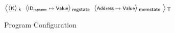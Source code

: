 \begin{figure}[ht]
  \centering
  \renewcommand{\dotCt}[1]{\scriptstyle\s{#1}}
  \newcommand{\regstate}{\scriptstyle\s{ID}_\s{regname} \;\mapsto\; \s{Value}}
  \newcommand{\argc}{\scriptstyle\s{Int}}
  \newcommand{\argv}{\scriptstyle\s{Address}} 
  \newcommand{\entrypoint}{\scriptstyle\s{Address}}
  \newcommand{\codemem}{\scriptstyle\textit{Address} \;\mapsto\; \textit{Instruction}}
  \newcommand{\datamem}{\scriptstyle\s{Address} \;\mapsto\; \s{Value}}
  \newcommand{\bssmem}{\scriptstyle\textit{Address} \;\mapsto\; \textit{Value}}
  \newcommand{\stackmem}{\scriptstyle\textit{Address} \;\mapsto\; \textit{Value}}
  \newcommand{\heapmem}{\scriptstyle\textit{Address} \;\mapsto\; \textit{Value}}
$
\kall{T}{
  \begin{array}{@{}c@{}}
  \kall{k}{\dotCt{K}} \mathrel{}
  \mathrel{}
  \kall{regstate}{\regstate} \mathrel{}
  \mathrel{}
  \kall{memstate} {\datamem} \mathrel{}
  \mathrel{}
  \cmt{ 
  \kall{executionEnv}{ 
  \kall{commandineArgs}{
    \kall{argc}{\argc} \mathrel{}    
    \kall{argv}{\argv} \mathrel{}
  } \mathrel{}
  \kall{entryPoint}{\entrypoint} \mathrel{}
}}
  \end{array}
}
$
  \caption{Program Configuration}
  \label{fig:config}
\end{figure}
